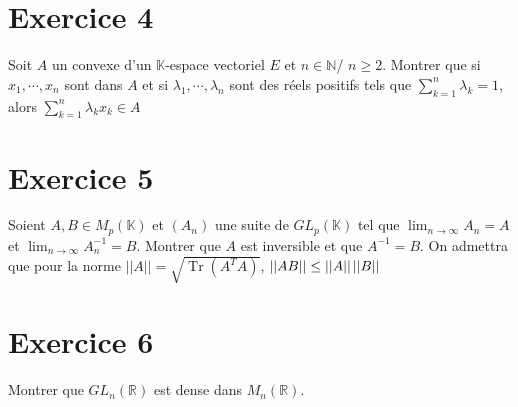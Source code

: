 \documentclass[11pt]{article}
\begin{document}
\section*{Exercice 4}

Soit $A$ un convexe d'un $\mathbb{K}$-espace vectoriel $E$ et $n\in \mathbb{N}$/ $n\geq 2$. Montrer que si $x_1,\cdots,x_n$ sont dans $A$ et si $\lambda_1,\cdots,\lambda_n$ sont des réels positifs tels que $\sum_{k=1}^n \lambda_k =1$, alors $\sum_{k=1}^n \lambda_k x_k \in A$

\section*{Exercice 5}

Soient $A,B\in M_p(\mathbb{K})$ et $(A_n)$ une suite de $GL_p(\mathbb{K})$ tel que $\lim_{n\to \infty} A_n = A$ et $\lim_{n\to \infty}A_n^{-1} = B$. Montrer que $A$ est inversible et que $A^{-1} = B$. On admettra que pour la norme $||A||=\sqrt{\operatorname{Tr}(A^TA)}$, $||AB||\leq ||A||\hspace{0.5mm}||B||$

\section*{Exercice 6}

Montrer que $GL_n(\mathbb{R})$ est dense dans $M_n(\mathbb{R})$.
\end{document}
